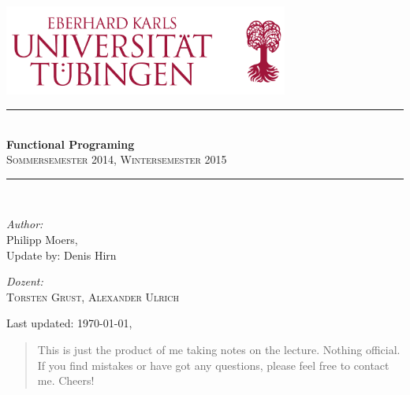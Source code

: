 \documentclass[12pt,a4paper]{article}
\begin{document}

\begin{titlepage}
    \begin{center}
        \includegraphics[width=0.7\textwidth]{logo-uni-tuebingen}\\[1cm]

        \newcommand{\HRule}{\rule{\linewidth}{0.5mm}} \HRule \\[0.4cm]
        { \huge \bfseries Functional Programing}\\[0.4cm]

        \textsc{\Large Sommersemester 2014, Wintersemester 2015}\\[0.5cm]
        \HRule \\[1.5cm]

        \begin{minipage}{0.4\textwidth}
            \begin{flushleft}
                \large \emph{Author:}\\ Philipp Moers,\\Update by: Denis Hirn
            \end{flushleft}
        \end{minipage}
            \hfill
        \begin{minipage}{0.4\textwidth}
            \begin{flushright}
                \large \emph{Dozent:} \\ \scshape{Torsten Grust, Alexander Ulrich}
            \end{flushright}
        \end{minipage}

        \vfill
        {Last updated: \today, \currenttime}
    \end{center}
\end{titlepage}

\begin{abstract}
    This is just the product of me taking notes on the lecture. Nothing official. If you find mistakes or have got any questions, please feel free to contact me. Cheers!
\end{abstract}
\end{document}
